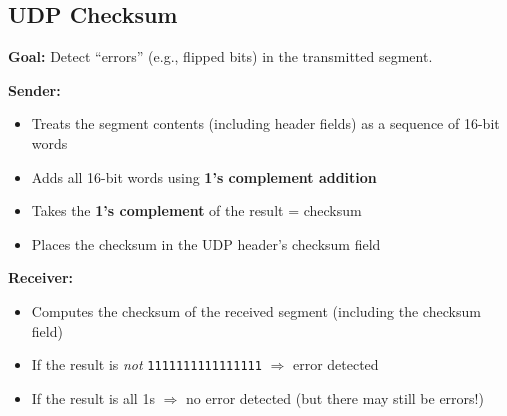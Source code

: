 \begin{center}
\end{center}

\begin{imagebox}
\end{imagebox}

\subsection{UDP Checksum}

\begin{keybox}
\textbf{Goal:} Detect ``errors'' (e.g., flipped bits) in the transmitted segment.

\textbf{Sender:}
\begin{itemize}[noitemsep]
    \item Treats the segment contents (including header fields) as a sequence of 16-bit words
    \item Adds all 16-bit words using \textbf{1's complement addition}
    \item Takes the \textbf{1's complement} of the result = checksum
    \item Places the checksum in the UDP header's checksum field
\end{itemize}

\textbf{Receiver:}
\begin{itemize}[noitemsep]
    \item Computes the checksum of the received segment (including the checksum field)
    \item If the result is \emph{not} \texttt{1111111111111111} $\Rightarrow$ error detected
    \item If the result is all 1s $\Rightarrow$ no error detected (but there may still be errors!)
\end{itemize}
\end{keybox}

